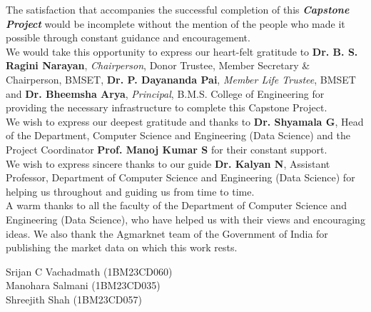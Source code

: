 \documentclass[12pt,a4paper]{report}
\renewcommand{\headrulewidth}{1.8pt}
\renewcommand{\footrulewidth}{1.8pt}
\theoremstyle{definition}
\begin{document}
\noindent The satisfaction that accompanies the successful completion of this \textit{\textbf{Capstone Project}} would be incomplete without the mention of the people who made it possible through constant guidance and encouragement.\\
\noindent We would take this opportunity to express our heart-felt gratitude to \textbf{Dr. B. S. Ragini Narayan}, \textit{Chairperson}, Donor Trustee, Member Secretary \& Chairperson, BMSET, \textbf{Dr. P. Dayananda Pai}, \textit{Member Life Trustee}, BMSET and \textbf{Dr. Bheemsha Arya}, \textit{Principal}, B.M.S. College of Engineering for providing the necessary infrastructure to complete this Capstone Project.\\
\noindent We wish to express our deepest gratitude and thanks to \textbf{Dr. Shyamala G}, Head of the Department, Computer Science and Engineering (Data Science) and the Project Coordinator \textbf{Prof. Manoj Kumar S} for their constant support.\\
\noindent We wish to express sincere thanks to our guide \textbf{Dr. Kalyan N}, Assistant Professor, Department of Computer Science and Engineering (Data Science) for helping us throughout and guiding us from time to time.\\
\noindent A warm thanks to all the faculty of the Department of Computer Science and Engineering (Data Science), who have helped us with their views and encouraging ideas. We also thank the Agmarknet team of the Government of India for publishing the market data on which this work rests.

\vspace{1.4cm}
\begin{flushright}
Srijan C Vachadmath (1BM23CD060)\\
Manohara Salmani (1BM23CD035)\\
Shreejith Shah (1BM23CD057)
\end{flushright}

\clearpage
\tableofcontents
\clearpage
{}
\listoftables
\clearpage
{}
\listoffigures
\clearpage


\clearpage
{}
\fancypagestyle{plain}{\fancyhf{}\renewcommand{\headrulewidth}{0pt}\renewcommand{\footrulewidth}{0pt}}
\pagestyle{chapterstyle}








\appendix



\end{document}
